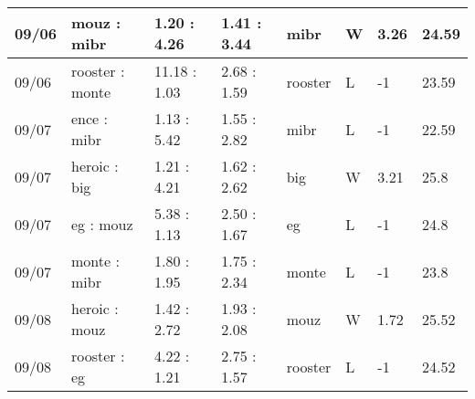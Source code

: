 \begin{small}
\begin{longtable}{|l|l|l|l|l|l|l|l|}
	09/06                               & mouz : mibr                         & 1.20 : 4.26                             & 1.41 : 3.44                             & mibr                              & W                                 & 3.26                                 & 24.59                             \\ \hline
	09/06                               & rooster : monte                     & 11.18 : 1.03                            & 2.68 : 1.59                             & rooster                           & L                                 & -1                                   & 23.59                             \\ \hline
	09/07                               & ence : mibr                         & 1.13 : 5.42                             & 1.55 : 2.82                             & mibr                              & L                                 & -1                                   & 22.59                             \\ \hline
	09/07                               & heroic : big                        & 1.21 : 4.21                             & 1.62 : 2.62                             & big                               & W                                 & 3.21                                 & 25.8                              \\ \hline
	09/07                               & eg : mouz                           & 5.38 : 1.13                             & 2.50 : 1.67                             & eg                                & L                                 & -1                                   & 24.8                              \\ \hline
	09/07                               & monte : mibr                        & 1.80 : 1.95                             & 1.75 : 2.34                             & monte                             & L                                 & -1                                   & 23.8                              \\ \hline
	09/08                               & heroic : mouz                       & 1.42 : 2.72                             & 1.93 : 2.08                             & mouz                              & W                                 & 1.72                                 & 25.52                             \\ \hline
	09/08                               & rooster : eg                        & 4.22 : 1.21                             & 2.75 : 1.57                             & rooster                           & L                                 & -1                                   & 24.52                             \\ \hline

\end{longtable}
\end{small}

